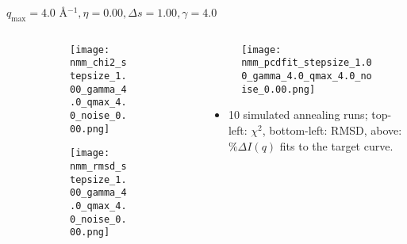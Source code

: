 \documentclass{beamer}
\begin{document}
\begin{frame}{$ q_{\textrm{max}}=4.0 $ \AA $^{-1}, \eta=0.00, \Delta s=1.00, \gamma=4.0$}
	\begin{columns}
		\begin{column}{.5\textwidth}
			\begin{figure}[H]
			\centering
			\begin{subfigure}[b]{\textwidth}
				\centering
				\texttt{[image: nmm\_chi2\_stepsize\_1.00\_gamma\_4.0\_qmax\_4.0\_noise\_0.00.png]}
				\label{fig:}
			\end{subfigure}
			\begin{subfigure}[b]{\textwidth}
				\centering
				\texttt{[image: nmm\_rmsd\_stepsize\_1.00\_gamma\_4.0\_qmax\_4.0\_noise\_0.00.png]}
				\label{fig:}
			\end{subfigure}
			\end{figure}
		\end{column}
		\begin{column}{.5\textwidth}
			\begin{figure}[H]
				\centering
				\texttt{[image: nmm\_pcdfit\_stepsize\_1.00\_gamma\_4.0\_qmax\_4.0\_noise\_0.00.png]}
				\label{fig:}
			\end{figure}
			\begin{itemize}
				\item 10 simulated annealing runs; top-left: $\chi^2$, bottom-left: RMSD, above: $\%\Delta I(q)$ fits to the target curve.
			\end{itemize}
		\end{column}
	\end{columns}
\end{frame}
 
\end{document}
